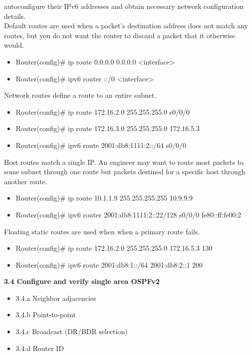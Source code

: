 \documentclass{article}
\begin{document}
autoconfigure their IPv6 addresses and obtain necessary network configuration details.\\
	
Default routes are used when a packet's destination address does not match any routes, but you do not want the router to discard a packet that it otherwise would.
\begin{itemize}
\item Router(config)\# ip route 0.0.0.0 0.0.0.0 \textless interface\textgreater
\item Router(config)\# ipv6 router ::/0 \textless interface\textgreater
\end{itemize}

Network routes define a route to an entire subnet.
\begin{itemize}
\item Router(config)\# ip route 172.16.2.0 255.255.255.0 s0/0/0
\item Router(config)\# ip route 172.16.3.0 255.255.255.0 172.16.5.3
\item Router(config)\# ipv6 route 2001:db8:1111:2::/64 s0/0/0
\end{itemize}
		
Host routes match a single IP. An engineer may want to route most packets to some subnet through one route but packets destined for a specific host through another route.
\begin{itemize}
\item Router(config)\# ip route 10.1.1.9 255.255.255.255 10.9.9.9
\item Router(config)\# ipv6 router 2001:db8:1111:2::22/128 s0/0/0 fe80::ff:fe00:2
\end{itemize}
		
Floating static routes are used when when a primary route fails.
\begin{itemize}
\item Router(config)\# ip route 172.16.2.0 255.255.255.0 172.16.5.3 130
\item Router(config)\# ipv6 route 2001:db8:1::/64 2001:db8:2::1 200
\end{itemize}
		
\textbf{3.4 Configure and verify single area OSPFv2}
\begin{itemize}
\item 3.4.a Neighbor adjacencies
\item 3.4.b Point-to-point
\item 3.4.c Broadcast (DR/BDR selection)
\item 3.4.d Router ID
\end{itemize}
  
\end{document}
